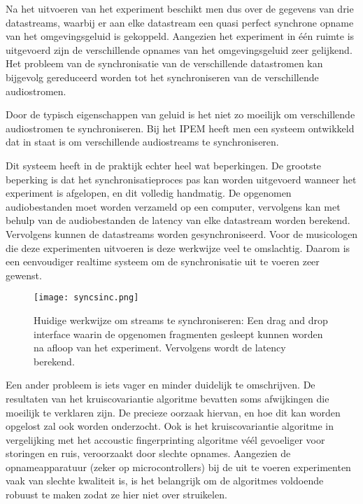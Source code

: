 Na het uitvoeren van het experiment beschikt men dus over de gegevens van drie datastreams, waarbij er aan elke datastream een quasi perfect synchrone opname van het omgevingsgeluid is gekoppeld. Aangezien het experiment in één ruimte is uitgevoerd zijn de verschillende opnames van het omgevingsgeluid zeer gelijkend. Het probleem van de synchronisatie van de verschillende datastromen kan bijgevolg gereduceerd worden tot het synchroniseren van de verschillende audiostromen.

Door de typisch eigenschappen van geluid is het niet zo moeilijk om verschillende audiostromen te synchroniseren. Bij het IPEM heeft men een systeem ontwikkeld dat in staat is om verschillende audiostreams te synchroniseren.

Dit systeem heeft in de praktijk echter heel wat beperkingen. De grootste beperking is dat het synchronisatieproces pas kan worden uitgevoerd wanneer het experiment is afgelopen, en dit volledig handmatig. De opgenomen audiobestanden moet worden verzameld op een computer, vervolgens kan met behulp van de audiobestanden de latency van elke datastream worden berekend. Vervolgens kunnen de datastreams worden gesynchroniseerd. Voor de musicologen die deze experimenten uitvoeren is deze werkwijze veel te omslachtig. Daarom is een eenvoudiger realtime systeem om de synchronisatie uit te voeren zeer gewenst.

\begin{figure}[!h]
	\captionsetup{width=0.7\textwidth}
	\centering
	\texttt{[image: syncsinc.png]}
	\caption[Huidge werkwijze voor streamsynchronisatie]{Huidige werkwijze om streams te synchroniseren: Een drag and drop interface waarin de opgenomen fragmenten gesleept kunnen worden na afloop van het experiment. Vervolgens wordt de latency berekend.}
\end{figure}


Een ander probleem is iets vager en minder duidelijk te omschrijven. De resultaten van het kruiscovariantie algoritme bevatten soms afwijkingen die moeilijk te verklaren zijn. De precieze oorzaak hiervan, en hoe dit kan worden opgelost zal ook worden onderzocht. Ook is het kruiscovariantie algoritme in vergelijking met het accoustic fingerprinting algoritme véél gevoeliger voor storingen en ruis, veroorzaakt door slechte opnames. Aangezien de opnameapparatuur (zeker op microcontrollers) bij de uit te voeren experimenten vaak van slechte kwaliteit is, is het belangrijk om de algoritmes voldoende robuust te maken zodat ze hier niet over struikelen.

